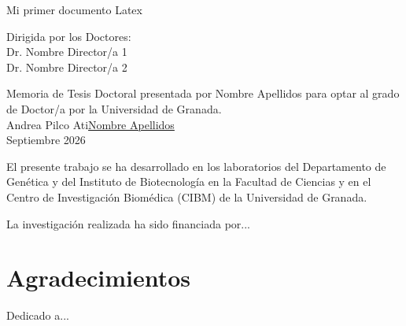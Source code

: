 \documentclass[b5paper, 10pt]{book}
\newcommand{\titulo}{Mi primer documento Latex}
\newcommand{\yo}{Andrea Pilco Ati}
\newcommand{\fecha}{Septiembre 2026}
\begin{document}
\vfill

\begin{center}
	\LARGE
	\titulo
\end{center}

\vfill

\begin{minipage}[t]{.4\textwidth}
	Dirigida por los Doctores:\\[3em]
	Dr. Nombre Director/a 1\\[3em]
	Dr. Nombre Director/a 2
\end{minipage}
\hfill
\begin{minipage}[t]{.5\textwidth}
	Memoria de Tesis Doctoral presentada por Nombre Apellidos para optar al grado de Doctor/a por la Universidad de Granada.\\[5em]
	\centering
	\yo\underline{Nombre Apellidos}\\[0.5em]
	\fecha
\end{minipage}


\cleardoublepage
\thispagestyle{empty}

\null{}
El presente trabajo se ha desarrollado en los laboratorios del Departamento de Genética y del Instituto de Biotecnología en la Facultad de Ciencias y en el Centro de Investigación Biomédica (CIBM) de la Universidad de Granada. 

La investigación realizada ha sido financiada por...


\cleardoublepage
\section*{Agradecimientos}



\cleardoublepage
\null{}
\begin{flushright}
	Dedicado a...
\end{flushright}
\end{document}
